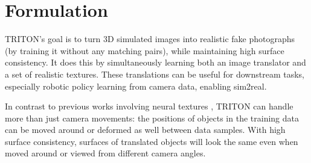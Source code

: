 \documentclass{article}
\begin{document}


\section{Formulation}
\label{sec:data}
\vspace{-3pt}
	TRITON's goal is to turn 3D simulated images into realistic fake photographs (by training it without any matching pairs), while maintaining high surface consistency.
	It does this by simultaneously learning both an image translator and a set of realistic textures.
	These translations can be useful for downstream tasks, especially robotic policy learning from camera data, enabling sim2real.
	
	In contrast to previous works involving neural textures \cite{deferred_neural_rendering,surgical_video_translation}, TRITON can handle more than just camera movements:
	the positions of objects in the training data can be moved around or deformed as well between data samples.
	With high surface consistency, surfaces of translated objects will look the same even when moved around or viewed from different camera angles.
\end{document}
